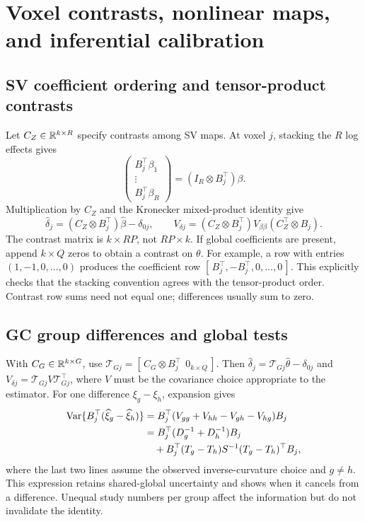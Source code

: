 \section{Voxel contrasts, nonlinear maps, and inferential calibration}
\label{cov-inference}

\subsection{SV coefficient ordering and tensor-product contrasts}
\label{cov-sv-contrasts}

Let $C_Z\in\mathbb R^{k\times R}$ specify contrasts among SV maps.
At voxel $j$, stacking the $R$ log effects gives
\[
 \begin{pmatrix}B_j^\top\beta_1\\ \vdots\\B_j^\top\beta_R\end{pmatrix}
 =(I_R\otimes B_j^\top)\beta .
\]
Multiplication by $C_Z$ and the Kronecker mixed-product identity give
\begin{equation}
 \widehat\delta_j
   =(C_Z\otimes B_j^\top)\widehat\beta-\delta_{0j},\qquad
 V_{\delta j}
   =(C_Z\otimes B_j^\top)V_{\beta\beta}
                    (C_Z^\top\otimes B_j).
 \label{cov-sv-contrast-formula}
\end{equation}
The contrast matrix is $k\times RP$, not $RP\times k$.
If global coefficients are present, append $k\times Q$ zeros to
obtain a contrast on $\theta$.  For example, a row with entries
$(1,-1,0,\ldots,0)$ produces the coefficient row
$[\,B_j^\top,-B_j^\top,0,\ldots,0\,]$.
This explicitly checks that the stacking convention agrees with the
tensor-product order.  Contrast row sums need not equal one; differences
usually sum to zero.

\subsection{GC group differences and global tests}
\label{cov-gc-contrasts}

With $C_G\in\mathbb R^{k\times G}$, use
$\mathcal T_{Gj}=[\,C_G\otimes B_j^\top\ \ 0_{k\times Q}\,]$.
Then $\widehat\delta_j=\mathcal T_{Gj}\widehat\theta-\delta_{0j}$
and $V_{\delta j}=\mathcal T_{Gj}V\mathcal T_{Gj}^\top$,
where $V$ must be the covariance choice appropriate to the estimator.
For one difference $\xi_g-\xi_h$, expansion gives
\begin{align}
 \operatorname{Var}\{B_j^\top(\widehat\xi_g-\widehat\xi_h)\}
 &=B_j^\top(V_{gg}+V_{hh}-V_{gh}-V_{hg})B_j\\
 &=B_j^\top(D_g^{-1}+D_h^{-1})B_j\\
 &\quad+B_j^\top(T_g-T_h)S^{-1}(T_g-T_h)^\top B_j,
 \label{cov-gc-difference}
\end{align}
where the last two lines assume the observed inverse-curvature choice
and $g\ne h$.  This expression retains shared-global uncertainty and
shows when it cancels from a difference.  Unequal study numbers
per group affect the information but do not invalidate the identity.

